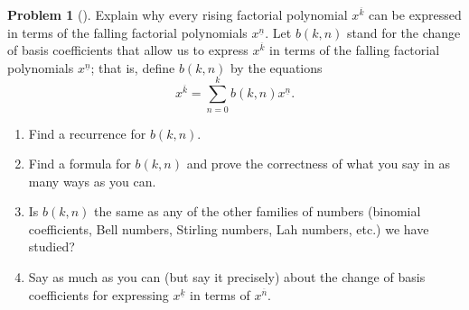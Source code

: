 \documentclass[10pt,]{book}
\theoremstyle{plain}
\theoremstyle{definition}
\newtheorem{activity}[project]{Problem}
\theoremstyle{definition}
\numberwithin{equation}{chapter}
\newcommand{\importantarrow}{\Rightarrow}
\begin{document}
\begin{activity}[]\marginsymbol[-1em]{\pdftooltip{$\importantarrow$}{especially interesting}} \label{activity-156}
Explain why every rising factorial polynomial \(x^{\overline{k}}\) can be expressed in terms of the falling factorial polynomials \(x^{\underline{n}}\). Let \(b(k,n)\) stand for the change of basis coefficients that allow us to express \(x^{\overline{k}}\) in terms of the falling factorial polynomials \(x^{\underline{n}}\); that is, define \(b(k,n)\) by the equations%
\begin{equation*}
x^{\overline{k}}=\sum_{n=0}^k b(k,n) x^{\underline{n}}.
\end{equation*}
%
\begin{enumerate}[font=\bfseries,label=(\alph*),ref=\alph*]
\item\label{task-113} \marginsymbol[-2.5em]{} Find a recurrence for \(b(k,n)\).%
\item\label{task-114} \marginsymbol[-2.5em]{} Find a formula for \(b(k,n)\) and prove the correctness of what you say in as many ways as you can.%
\item\label{task-115} \marginsymbol[-2.5em]{} Is \(b(k,n)\) the same as any of the other families of numbers (binomial coefficients, Bell numbers, Stirling numbers, Lah numbers, etc.) we have studied?%
\item\label{task-116} \marginsymbol[-2.5em]{} Say as much as you can (but say it precisely) about the change of basis coefficients for expressing \(x^{\underline{k}}\) in terms of \(x^{\overline{n}}\).%
\end{enumerate}
\end{activity}
\typeout{************************************************}
\typeout{************************************************}
\end{document}
